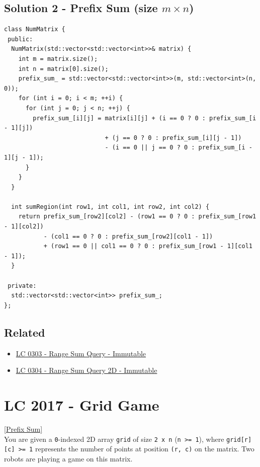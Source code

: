 \subsection*{Solution 2 - Prefix Sum (size $m \times n$)}
\begin{lstlisting}
class NumMatrix {
 public:
  NumMatrix(std::vector<std::vector<int>>& matrix) {
    int m = matrix.size();
    int n = matrix[0].size();
    prefix_sum_ = std::vector<std::vector<int>>(m, std::vector<int>(n, 0));
    for (int i = 0; i < m; ++i) {
      for (int j = 0; j < n; ++j) {
        prefix_sum_[i][j] = matrix[i][j] + (i == 0 ? 0 : prefix_sum_[i - 1][j])
                            + (j == 0 ? 0 : prefix_sum_[i][j - 1])
                            - (i == 0 || j == 0 ? 0 : prefix_sum_[i - 1][j - 1]);
      }
    }
  }

  int sumRegion(int row1, int col1, int row2, int col2) {
    return prefix_sum_[row2][col2] - (row1 == 0 ? 0 : prefix_sum_[row1 - 1][col2])
           - (col1 == 0 ? 0 : prefix_sum_[row2][col1 - 1])
           + (row1 == 0 || col1 == 0 ? 0 : prefix_sum_[row1 - 1][col1 - 1]);
  }

 private:
  std::vector<std::vector<int>> prefix_sum_;
};
\end{lstlisting}

\subsection*{Related}
\begin{itemize}
\item \hyperref[lc0303]{LC 0303 - Range Sum Query - Immutable}
\item \hyperref[lc0304]{LC 0304 - Range Sum Query 2D - Immutable}
\end{itemize}

\section{LC 2017 - Grid Game}\label{lc2017}
\hyperref[sec:prefix_sum]{[Prefix Sum]}\\

You are given a {\colorbox{CodeBackground}{\lstinline|0|}}-indexed 2D array {\colorbox{CodeBackground}{\lstinline|grid|}} of size {\colorbox{CodeBackground}{\lstinline|2 x n|}} ({\colorbox{CodeBackground}{\lstinline|n >= 1|}}), where {\colorbox{CodeBackground}{\lstinline|grid[r][c] >= 1|}} represents the number of points at position {\colorbox{CodeBackground}{\lstinline|(r, c)|}} on the matrix. Two robots are playing a game on this matrix.\\

